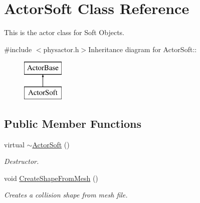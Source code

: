 \hypertarget{classActorSoft}{
\section{ActorSoft Class Reference}
\label{d5/da4/classActorSoft}
}


This is the actor class for Soft Objects.  


{\ttfamily \#include $<$physactor.h$>$}Inheritance diagram for ActorSoft::\begin{figure}[H]
\begin{center}
\leavevmode
\includegraphics[height=2cm]{d5/da4/classActorSoft}
\end{center}
\end{figure}
\subsection*{Public Member Functions}
\begin{DoxyCompactItemize}
\item 
virtual \hyperlink{classActorSoft_af58881c064fa2182a2347eb8755696b0}{$\sim$ActorSoft} ()
\begin{DoxyCompactList}\small\item\em Destructor. \item\end{DoxyCompactList}\item 
void \hyperlink{classActorSoft_a55ac461f317aed2b812f07eb384b2a6d}{CreateShapeFromMesh} ()
\begin{DoxyCompactList}\small\item\em Creates a collision shape from mesh file. \item\end{DoxyCompactList}\end{DoxyCompactItemize}
